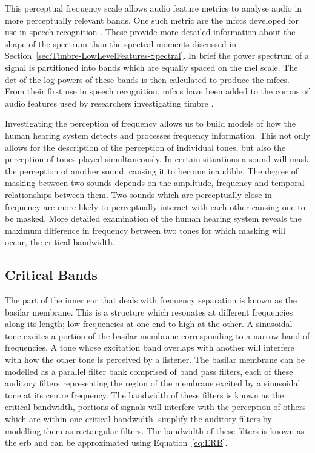 		This perceptual frequency scale allows audio feature metrics to analyse audio in more perceptually relevant
		bands. One such metric are the \acrfull{mfccs} developed for use in speech recognition
		\citep{davis1980comparison}. These provide more detailed information about the shape of the spectrum than
		the spectral moments discussed in Section~\ref{sec:Timbre-LowLevelFeatures-Spectral}. In brief the power
		spectrum of a signal is partitioned into bands which are equally spaced on the mel scale.  The
		\acrfull{dct} of the log powers of these bands is then calculated to produce the \acrshort{mfccs}. From
		their first use in speech recognition, \acrshort{mfccs} have been added to the corpus of audio features
		used by researchers investigating timbre \citep{depoli1997sonological}. 

		Investigating the perception of frequency allows us to build models of how the human hearing system detects
		and processes frequency information. This not only allows for the description of the perception of
		individual tones, but also the perception of tones played simultaneously. In certain situations a sound
		will mask the perception of another sound, causing it to become inaudible. The degree of masking between
		two sounds depends on the amplitude, frequency and temporal relationships between them. Two sounds which
		are perceptually close in frequency are more likely to perceptually interact with each other causing one to
		be masked. More detailed examination of the human hearing system reveals the maximum difference in
		frequency between two tones for which masking will occur, the critical bandwidth.

	\subsection{Critical Bands}
	\label{sec:Timbre-PsychoacousticPrinciples-CriticalBands}
		The part of the inner ear that deals with frequency separation is known as the basilar membrane. This is a
		structure which resonates at different frequencies along its length; low frequencies at one end to high at
		the other. A sinusoidal tone excites a portion of the basilar membrane corresponding to a narrow band of
		frequencies. A tone whose excitation band overlaps with another will interfere with how the other tone is
		perceived by a listener. The basilar membrane can be modelled as a parallel filter bank comprised of band
		pass filters, each of these auditory filters representing the region of the membrane excited by a
		sinusoidal tone at its centre frequency. The bandwidth of these filters is known as the critical bandwidth,
		portions of signals will interfere with the perception of others which are within one critical bandwidth.
		\citet{glasberg1990derivation} simplify the auditory filters by modelling them as rectangular filters. The
		bandwidth of these filters is known as the \acrfull{erb} and can be approximated using
		Equation~\ref{eq:ERB}.

